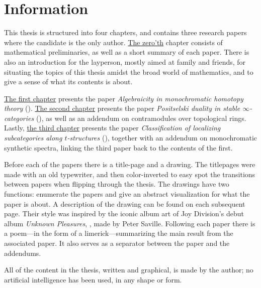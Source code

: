 
\section*{Information}

This thesis is structured into four chapters, and contains three research papers where the candidate is the only author. \hyperref[ch0]{The zero'th} chapter consists of mathematical preliminaries, as well as a short summary of each paper. There is also an introduction for the layperson, mostly aimed at family and friends, for situating the topics of this thesis amidst the broad world of mathematics, and to give a sense of what its contents is about.  

\hyperref[ch1]{The first chapter} presents the paper \emph{Algebraicity in monochromatic homotopy theory} (\cite{aambo_2024_algebraicity}). \hyperref[ch2]{The second chapter} presents the paper \emph{Positselski duality in stable $\infty$-categories} (\cite{aambo_2024_positselski}), as well as an addendum on contramodules over topological rings. Lastly, \hyperref[ch3]{the third chapter} presents the paper \emph{Classification of localizing subcategories along $t$-structures} (\cite{aambo_2024_localizing}), together with an addendum on monochromatic synthetic spectra, linking the third paper back to the contents of the first. 

Before each of the papers there is a title-page and a drawing. The titlepages were made with an old typewriter, and then color-inverted to easy spot the transitions between papers when flipping through the thesis. The drawings have two functions: enumerate the papers and give an abstract visualization for what the paper is about. A description of the drawing can be found on each subsequent page. Their style was inspired by the iconic album art of Joy Division's debut album \emph{Unknown Pleasures}, \cite{joy-division_79}, made by Peter Saville.  Following each paper there is a poem---in the form of a limerick---summarizing the main result from the associated paper. It also serves as a separator between the paper and the addendums. 

All of the content in the thesis, written and graphical, is made by the author; no artificial intelligence has been used, in any shape or form. 